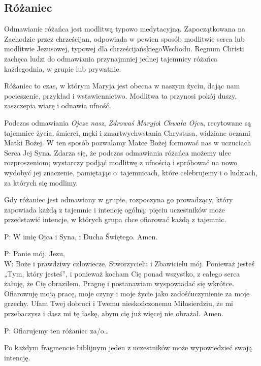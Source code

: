 ﻿\documentclass[9pt,twoside]{extarticle}
\newcommand{\gss}[1]{
  \subsection*{#1}
  \addcontentsline{toc}{subsection}{#1}
  \fancyhead[RO]{\hnb\tiny #1}
}
\begin{document}
\gss{Różaniec}


{\hnr Odmawianie różańca jest modlitwą typowo medytacyjną. Zapoczątkowana na Zachodzie przez chrześcijan, odpowiada w pewien sposób modlitwie serca lub modlitwie Jezusowej, typowej dla chrześcijańskiego\linebreak Wschodu. Regnum Christi zachęca ludzi do odmawiania przynajmniej jednej tajemnicy różańca każdego\linebreak dnia, w grupie lub prywatnie.


Różaniec to czas, w którym Maryja jest obecna w naszym życiu, dając nam pocieszenie, przykład i wstawiennictwo. Modlitwa ta przynosi pokój duszy, zaszczepia wiarę i odnawia ufność.


Podczas odmawiania {\em Ojcze nasz}, {\em Zdrowaś Maryjo}\linebreak i {\em Chwała Ojcu}, recytowane są tajemnice życia, śmierci, męki i zmartwychwstania Chrystusa, widziane oczami Matki Bożej. W ten sposób pozwalamy Matce Bożej formować nas w uczuciach Serca Jej Syna. Zdarza się, że podczas odmawiania różańca możemy ulec rozproszeniom; wystarczy podjąć modlitwę z ufnością i spróbować na nowo wydobyć jej znaczenie, pamiętając o~tajemnicach, które celebrujemy i o ludziach, za których się modlimy.}




{\hnr Gdy różaniec jest odmawiany w grupie, rozpoczyna go prowadzący, który zapowiada każdą z tajemnic i intencję ogólną; pięciu uczestników może przedstawić intencje, w których grupa chce ofiarować każdą z tajemnic.}


{\hnr P:} W imię Ojca i Syna, i Ducha Świętego. Amen.


{\hnr P:} Panie mój, Jezu,\\
{\hnr W:} Boże i prawdziwy człowiecze, Stworzycielu i Zbawicielu mój. Ponieważ jesteś „Tym, który jesteś”, i ponieważ kocham Cię ponad wszystko, z całego serca żałuję, że Cię obraziłem. Pragnę i postanawiam wyspowiadać się wkrótce. Ofiarowuję moją pracę, moje czyny i moje życie jako zadośćuczynienie za moje grzechy. Ufam Twej dobroci i Twemu nieskończonemu Miłosierdziu, że mi przebaczysz i dasz mi tę łaskę, abym cię już więcej nie obrażał. Amen.


{\hnr P:} Ofiarujemy ten różaniec za/o…


{\hnr Po każdym fragmencie biblijnym jeden z uczestników może wypowiedzieć swoją intencję.}


\end{document}
